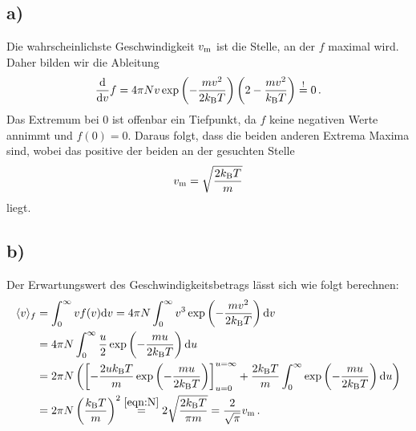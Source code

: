 \documentclass[a4paper, 11pt]{article}
\DeclarePairedDelimiter{\ev}{\langle}{\rangle}
\begin{document}
\subsection*{a)}
Die wahrscheinlichste Geschwindigkeit $v_\textup{m}$ ist die Stelle, an der $f$ maximal wird. Daher bilden wir die Ableitung
\begin{equation}
    \frac{\textup{d}}{\textup{d}v}f = 4\pi Nv\exp\left(-\frac{m v^2}{2 k_\textup{B}T}\right)\left(2 - \frac{mv^2}{k_\textup{B}T}\right) \stackrel{\textup{!}}{=} 0 \,.
\end{equation}
Das Extremum bei 0 ist offenbar ein Tiefpunkt, da $f$ keine negativen Werte annimmt und $f(0) = 0$. Daraus folgt, dass die beiden anderen Extrema Maxima sind, wobei das positive der beiden an der gesuchten Stelle
\begin{equation}
    v_\textup{m} = \sqrt{\frac{2 k_\textup{B} T}{m}}
    \label{eqn:v_m}
\end{equation}
liegt.

\subsection*{b)}
\label{subsec:b}
Der Erwartungswert des Geschwindigkeitsbetrags lässt sich wie folgt berechnen:
\begin{align}
    \ev{v}_f &= \int_{0}^{\infty} v f(v) \textup{d}v = 4\pi N \int_{0}^{\infty} v^3 \exp\left(-\frac{mv^2}{2k_\textup{B}T}\right) \textup{d}v \\
    &= 4\pi N \int_{0}^{\infty} \frac{u}{2} \exp\left(-\frac{mu}{2k_\textup{B}T}\right) \textup{d}u \\
    &= 2\pi N\left(\left[-\frac{2uk_\textup{B}T}{m}\exp\left(-\frac{mu}{2k_\textup{B}T}\right)\right]_{u=0}^{u=\infty} + \frac{2k_\textup{B}T}{m}\int_{0}^{\infty}\exp\left(-\frac{mu}{2k_\textup{B}T}\right) \textup{d}u\right) \\
    &= 2\pi N\left(\frac{k_\textup{B}T}{m}\right)^2 \stackrel{\eqref{eqn:N}}{=} 2 \sqrt{\frac{2k_\textup{B}T}{\pi m}} = \frac{2}{\sqrt{\pi}}v_\textup{m} \,.
\end{align}
\end{document}
